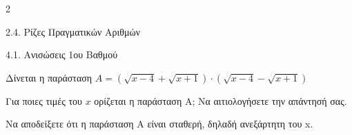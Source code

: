 \begin{ylh}{2}
    \item 2.4. Ρίζες Πραγματικών Αριθμών
    \item 4.1. Ανισώσεις 1ου Βαθμού
\end{ylh}
Δίνεται η παράσταση $A = (\sqrt{x - 4} + \sqrt{x + 1}) \cdot (\sqrt{x - 4} - \sqrt{x + 1})$

\begin{alist}
\item Για ποιες τιμές του $x$ ορίζεται η παράσταση Α; Να αιτιολογήσετε την απάντησή σας.
\item Να αποδείξετε ότι η παράσταση Α είναι σταθερή, δηλαδή ανεξάρτητη του x.
\end{alist}

